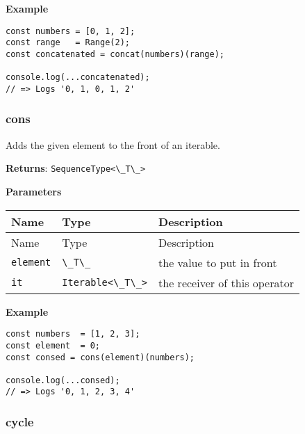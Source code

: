\textbf{Example}

\begin{lstlisting}[label=18038071-1b77-4cab-aa88-5e597bf2423d]
const numbers = [0, 1, 2];
const range   = Range(2);
const concatenated = concat(numbers)(range);
                                            
console.log(...concatenated);
// => Logs '0, 1, 0, 1, 2'
\end{lstlisting}

\hypertarget{6a9773d8-0837-456a-bbbb-9c926d98a336}{%
\subsubsection{cons}\label{6a9773d8-0837-456a-bbbb-9c926d98a336}}

Adds the given element to the front of an iterable.

\textbf{Returns}: \passthrough{\lstinline!SequenceType<\_T\_>!}

\textbf{Parameters}

\begin{longtable}[]{
  >{\raggedright\arraybackslash}p{}
  >{\raggedright\arraybackslash}p{}
  >{\raggedright\arraybackslash}p{}@{}}
  
\toprule\noalign{}
Name & Type & Description \\
\midrule\noalign{}
\endfirsthead
\toprule\noalign{}
Name & Type & Description \\
\midrule\noalign{}
\endhead
\bottomrule\noalign{}
\endlastfoot
\passthrough{\lstinline!element!} & \passthrough{\lstinline!\_T\_!} &
the value to put in front \\
\passthrough{\lstinline!it!} & \passthrough{\lstinline!Iterable<\_T\_>!}
& the receiver of this operator \\
\end{longtable}

\textbf{Example}

\begin{lstlisting}[label=875d77cc-924c-4f79-b69a-316c95a944d4]
const numbers  = [1, 2, 3];
const element  = 0;
const consed = cons(element)(numbers);
                                      
console.log(...consed);
// => Logs '0, 1, 2, 3, 4'
\end{lstlisting}

\hypertarget{9e681fc2-fb6e-4844-853e-d8238b44a848}{%
\subsubsection{cycle}\label{9e681fc2-fb6e-4844-853e-d8238b44a848}}

